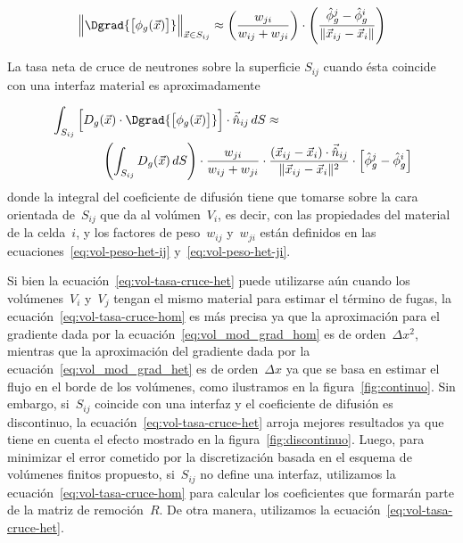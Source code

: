 \begin{equation*}
\Big\| \Dgrad {\big[ \phi_g(\vec{x}) \big]} \Big\|_{\vec{x} \in S_{ij}} \approx \left( \frac{w_{ji}}{w_{ij} + w_{ji}}\right) \cdot \left( \frac{\hat\phi_g^j - \hat{\phi}_g^i}{ \| \vec{x}_{ij} - \vec{x}_i \|} \right)
\end{equation*}

La tasa neta de cruce de neutrones sobre la superficie $S_{ij}$ cuando ésta coincide con una interfaz material es aproximadamente

\begin{align}\label{eq:vol-tasa-cruce-het}
& \int_{S_{ij}} \Big[ D_g(\vec{x}) \cdot \Dgrad {\big[\phi_g(\vec{x})\big]} \Big] \cdot \vec{\hat{n}}_{ij} \, dS \approx \nonumber \\
& \quad\quad\quad\quad
\left( \int_{S_{ij}} D_g(\vec{x}) \, dS \right) \cdot \frac{w_{ji}}{w_{ij} + w_{ji}} \cdot \frac{(\vec{x}_{ij} - \vec{x}_i) \cdot \vec{\hat{n}}_{ij}}{\| \vec{x}_{ij} - \vec{x}_i \|^2}  \cdot \Big[ \hat{\phi}_g^j - \hat{\phi}_g^i\Big]
\end{align}
%
donde la integral del coeficiente de difusión tiene que tomarse sobre la cara orientada de~$S_{ij}$ que da al volúmen~$V_i$, es decir, con las propiedades del material de la celda~$i$, y los factores de peso~$w_{ij}$ y~$w_{ji}$ están definidos en las ecuaciones~\eqref{eq:vol-peso-het-ij} y~\eqref{eq:vol-peso-het-ji}.

\medskip

Si bien la ecuación~\eqref{eq:vol-tasa-cruce-het} puede utilizarse aún cuando los volúmenes~$V_i$ y~$V_j$ tengan el mismo material para estimar el término de fugas, la ecuación~\eqref{eq:vol-tasa-cruce-hom} es más precisa ya que la aproximación para el gradiente dada por la ecuación~\eqref{eq:vol_mod_grad_hom} es de orden~$\Delta x^2$, mientras que la aproximación del gradiente dada por la ecuación~\eqref{eq:vol_mod_grad_het} es de orden~$\Delta x$ ya que se basa en estimar el flujo en el borde de los volúmenes, como ilustramos en la figura~\ref{fig:continuo}. Sin embargo, si~$S_{ij}$ coincide con una interfaz y el coeficiente de difusión es discontinuo, la ecuación~\eqref{eq:vol-tasa-cruce-het} arroja mejores resultados ya que tiene en cuenta el efecto mostrado en la figura~\ref{fig:discontinuo}. Luego, para minimizar el error cometido por la discretización basada en el esquema de volúmenes finitos propuesto, si~$S_{ij}$ no define una interfaz, utilizamos la ecuación~\eqref{eq:vol-tasa-cruce-hom} para calcular los coeficientes que formarán parte de la matriz de remoción~$R$. De otra manera, utilizamos la ecuación~\eqref{eq:vol-tasa-cruce-het}.


